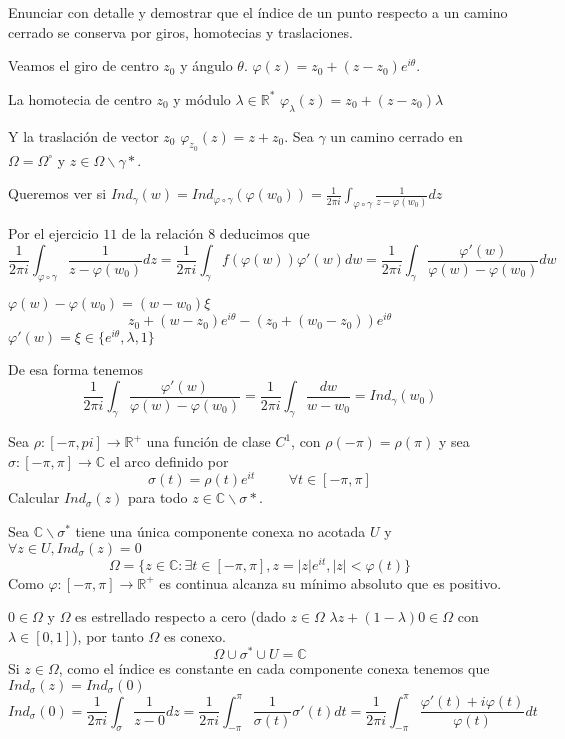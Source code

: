 \begin{ejer}
	Enunciar con detalle y demostrar que el índice de un punto respecto a un camino cerrado
	se conserva por giros, homotecias y traslaciones.
\end{ejer}

\begin{sol}
Veamos el giro de centro $z_0$ y ángulo $\theta$.
$\varphi(z) = z_0 + (z-z_0)e^{i\theta}$.

La homotecia de centro $z_0$ y módulo $\lambda\in\mathbb{R}^{\ast}$
$\varphi_{\lambda}(z) = z_0 + (z-z_0)\lambda$

Y la traslación de vector $z_0$
$\varphi_{z_0} (z) = z+z_0$.
Sea $\gamma$ un camino cerrado en $\Omega=\Omega^{\circ}$
y $z\in\Omega\backslash\gamma{\ast}$.

Queremos ver si  $Ind_{\gamma}(w)=Ind_{\varphi\circ\gamma} (\varphi(w_0)) = \frac{1}{2\pi i} \int_{\varphi\circ\gamma} \frac{1}{z-\varphi(w_0)} dz$
 
Por el ejercicio $11$ de la relación $8$ deducimos que
$$\frac{1}{2\pi i} \int_{\varphi\circ\gamma} \frac{1}{z-\varphi(w_0)} dz = \frac{1}{2\pi i} \int_{\gamma} f(\varphi(w))\varphi'(w) dw = \frac{1}{2\pi i} \int_{\gamma} \frac{\varphi'(w)}{\varphi(w)-\varphi(w_0)} dw$$

$\varphi(w)-\varphi(w_0) = (w-w_0) \xi$
$$z_0+(w-z_0)e^{i\theta}-(z_0+(w_0-z_0))e^{i\theta}$$
$\varphi'(w) = \xi \in \{ e^{i\theta},\lambda,1 \}$

De esa forma tenemos 
$$\frac{1}{2\pi i} \int_{\gamma} \frac{\varphi'(w)}{\varphi(w)-\varphi(w_0)} = \frac{1}{2\pi i} \int_{\gamma} \frac{dw}{w-w_0} = Ind_{\gamma}(w_0)$$
\end{sol}


\begin{ejer}
	Sea $\rho : [-\pi,pi]\rightarrow\mathbb{R}^+$ una función de clase $C^1$, con $\rho(-\pi) = \rho(\pi)$ y sea $\sigma :[-\pi,\pi] \rightarrow\mathbb{C}$ el arco definido por
	$$ \sigma(t) = \rho(t)e^{it} \hspace{1cm} \forall t\in [-\pi,\pi] $$
	Calcular $Ind_{\sigma}(z)$ para todo $z\in\mathbb{C}\backslash\sigma{\ast}$.
\end{ejer}
\begin{sol}

Sea $\mathbb{C}\backslash\sigma^{\ast}$ tiene una única componente conexa no acotada $U$ y $\forall z\in U, Ind_{\sigma}(z)=0$
$$\Omega = \{ z\in\mathbb{C} : \exists t\in[-\pi,\pi], z=|z|e^{it}, |z|<\varphi(t) \}$$
Como $\varphi : [-\pi,\pi] \rightarrow \mathbb{R}^+$ es continua alcanza su mínimo absoluto que es positivo.

$0\in\Omega$ y $\Omega$ es estrellado respecto a cero
(dado $z\in\Omega$ $\lambda z + (1-\lambda)0 \in\Omega$ con $\lambda\in[0,1]$), por tanto $\Omega$ es conexo.
$$\Omega \cup \sigma^{\ast} \cup U = \mathbb{C}$$
Si $z\in\Omega$, como el índice es constante en cada componente conexa tenemos que $Ind_{\sigma}(z) = Ind_{\sigma}(0)$
$$Ind_{\sigma}(0) = \frac{1}{2\pi i} \int_{\sigma} \frac{1}{z-0}dz = \frac{1}{2\pi i} \int_{-\pi}^{\pi} \frac{1}{\sigma(t)} \sigma'(t)dt = \frac{1}{2\pi i} \int_{-\pi}^{\pi} \frac{\varphi'(t)+i\varphi(t)}{\varphi(t)} dt$$

\end{sol}



